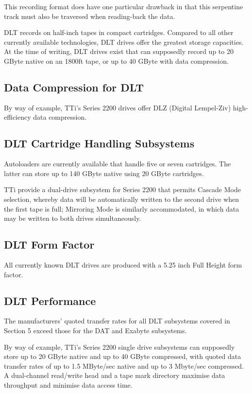 \documentclass[11pt]{article}
\begin{document}
This recording format does have one particular drawback in that this
serpentine track must also be traversed when reading-back the data.

DLT records on half-inch tapes in compact cartridges. Compared to all other
currently available technologies, DLT drives offer the greatest storage
capacities. At the time of writing, DLT drives exist that can supposedly
record up to 20 GByte native on an 1800ft tape, or up to 40 GByte with data
compression.

\subsection {Data Compression for DLT}

By way of example, TTi's Series 2200 drives offer DLZ (Digital Lempel-Ziv)
high-efficiency data compression.

\subsection {DLT Cartridge Handling Subsystems}

Autoloaders are currently available that handle five or seven cartridges.
The latter can store up to 140 GByte native using 20 GByte cartridges.

TTi provide a dual-drive subsystem for Series 2200 that permits Cascade Mode
selection, whereby data will be automatically written to the second drive
when the first tape is full; Mirroring Mode is similarly accommodated, in
which data may be written to both drives simultaneously.

\subsection {DLT Form Factor}

All currently known DLT drives are produced with a 5.25 inch Full Height
form factor.

\subsection {DLT Performance}

The manufacturers' quoted transfer rates for all DLT subsystems covered in
Section 5 exceed those for the DAT and Exabyte subsystems.

By way of example, TTi's Series 2200 single drive subsystems can supposedly
store up to 20 GByte native and up to 40 GByte compressed, with quoted data
transfer rates of up to 1.5 MByte/sec native and up to 3 Mbyte/sec
compressed. A dual-channel read/write head and a tape mark directory
maximise data throughput and minimise data access time.
\end{document}
